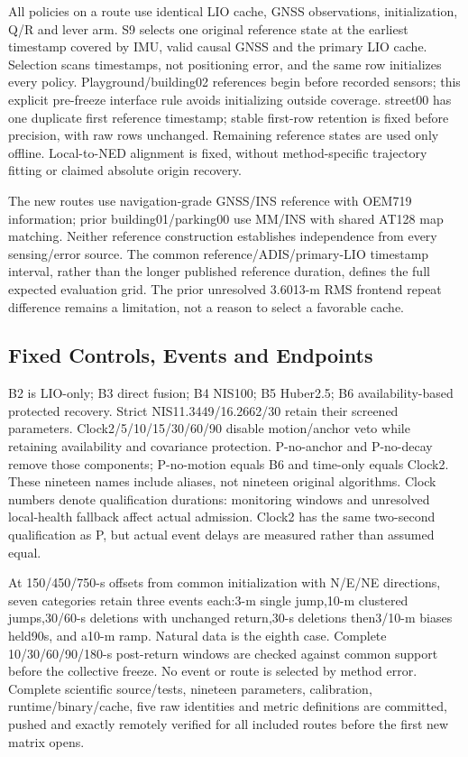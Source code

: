 \documentclass[conference]{IEEEtran}
\begin{document}
All policies on a route use identical LIO cache, GNSS observations, initialization, Q/R and lever arm. S9 selects one original reference state at the earliest timestamp covered by IMU, valid causal GNSS and the primary LIO cache. Selection scans timestamps, not positioning error, and the same row initializes every policy. Playground/building02 references begin before recorded sensors; this explicit pre-freeze interface rule avoids initializing outside coverage. street00 has one duplicate first reference timestamp; stable first-row retention is fixed before precision, with raw rows unchanged. Remaining reference states are used only offline. Local-to-NED alignment is fixed, without method-specific trajectory fitting or claimed absolute origin recovery.

The new routes use navigation-grade GNSS/INS reference with OEM719 information; prior building01/parking00 use MM/INS with shared AT128 map matching. Neither reference construction establishes independence from every sensing/error source. The common reference/ADIS/primary-LIO timestamp interval, rather than the longer published reference duration, defines the full expected evaluation grid. The prior unresolved 3.6013-m RMS frontend repeat difference remains a limitation, not a reason to select a favorable cache.

\subsection{Fixed Controls, Events and Endpoints}
B2 is LIO-only; B3 direct fusion; B4 NIS100; B5 Huber2.5; B6 availability-based protected recovery. Strict NIS11.3449/16.2662/30 retain their screened parameters. Clock2/5/10/15/30/60/90 disable motion/anchor veto while retaining availability and covariance protection. P-no-anchor and P-no-decay remove those components; P-no-motion equals B6 and time-only equals Clock2. These nineteen names include aliases, not nineteen original algorithms. Clock numbers denote qualification durations: monitoring windows and unresolved local-health fallback affect actual admission. Clock2 has the same two-second qualification as P, but actual event delays are measured rather than assumed equal.

At 150/450/750-s offsets from common initialization with N/E/NE directions, seven categories retain three events each:3-m single jump,10-m clustered jumps,30/60-s deletions with unchanged return,30-s deletions then3/10-m biases held90s, and a10-m ramp. Natural data is the eighth case. Complete 10/30/60/90/180-s post-return windows are checked against common support before the collective freeze. No event or route is selected by method error. Complete scientific source/tests, nineteen parameters, calibration, runtime/binary/cache, five raw identities and metric definitions are committed, pushed and exactly remotely verified for all included routes before the first new matrix opens.
\end{document}
